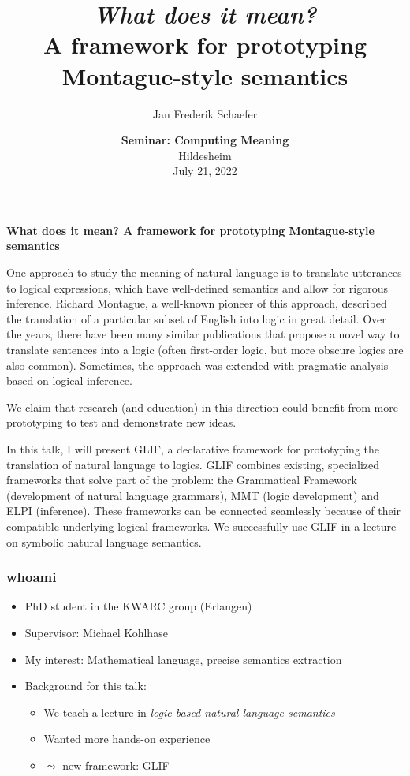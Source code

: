 \documentclass[aspectratio=169]{beamer}
\title{\textit{What does it mean?}\\A framework for prototyping Montague-style semantics}
\author{Jan Frederik Schaefer}
\institute{FAU Erlangen-N\"urnberg/KWARC}
\date{\textbf{Seminar: Computing Meaning}\\Hildesheim\\July 21, 2022}
\begin{document}
\begin{frame}
    \textbf{What does it mean? A framework for prototyping Montague-style semantics}
    \small

    \begin{block}{}
        \parbox{\linewidth}{
            One approach to study the meaning of natural language is to translate
            utterances to logical expressions, which have well-defined semantics and allow
            for rigorous inference.  Richard Montague, a well-known pioneer of this
            approach, described the translation of a particular subset of English into
            logic in great detail.  Over the years, there have been many similar
            publications that propose a novel way to translate sentences into a logic
            (often first-order logic, but more obscure logics are also common).  Sometimes,
            the approach was extended with pragmatic analysis based on logical inference.

            We claim that research (and education) in this direction could benefit from
            more prototyping to test and demonstrate new ideas.

            In this talk, I will present GLIF, a declarative framework for prototyping the
            translation of natural language to logics.  GLIF combines existing, specialized
            frameworks that solve part of the problem: the Grammatical Framework
            (development of natural language grammars), MMT (logic development) and ELPI
            (inference).  These frameworks can be connected seamlessly because of their
            compatible underlying logical frameworks.  We successfully use GLIF in a
            lecture on symbolic natural language semantics.
        }
    \end{block}
\end{frame}

\frame\titlepage

\begin{frame}
    \frametitle{whoami}
    \begin{itemize}
        \item PhD student in the KWARC group (Erlangen)
        \item Supervisor: Michael Kohlhase
        \item My interest: Mathematical language, precise semantics extraction
        \item Background for this talk:
            \begin{itemize}
                \item We teach a lecture in \emph{logic-based natural language semantics}
                \item Wanted more hands-on experience
                \item $\leadsto$ new framework: GLIF
            \end{itemize}
    \end{itemize}
\end{frame}
\end{document}
